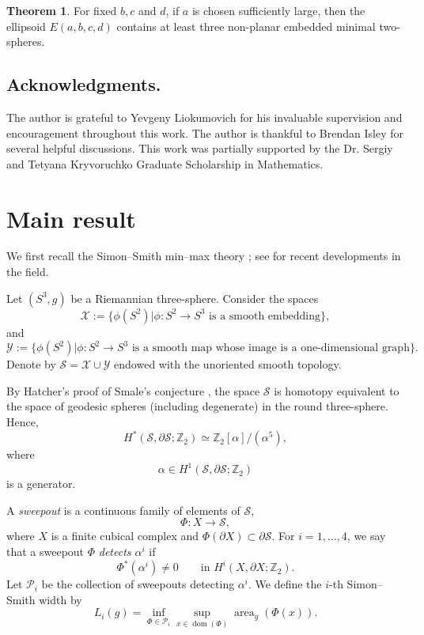 \documentclass[12pt,english]{amsart}
\theoremstyle{definition}
\newtheorem{theorem}{Theorem}[section]
\begin{document}
\begin{theorem}
\label{thm:yau}
For fixed $b,c$ and $d$, if $a$ is chosen sufficiently large, then the ellipsoid $E(a,b,c,d)$ contains at least three non-planar embedded minimal two-spheres.
\end{theorem}

\subsection*{Acknowledgments.}
The author is grateful to Yevgeny Liokumovich for his invaluable supervision and encouragement throughout this work. The author is thankful to Brendan Isley for several helpful discussions. This work was partially supported by the Dr. Sergiy and Tetyana Kryvoruchko Graduate Scholarship in Mathematics.

\section{Main result}

We first recall the Simon--Smith min--max theory \cite{SS}; see \cite{Chu, CL, CLhom, CLW1, CLW2, CD, DP, HK, HK1, K, LWY, LW, WZ} for recent developments in the field.

Let \((S^3,g)\) be a Riemannian three-sphere. Consider the spaces
\[
\mathcal X:=\{\phi(S^2)\big|\phi: S^2\to S^3 \text{ is a smooth embedding}\},
\]
and 
\[
\mathcal Y:=\{\phi(S^2)\big|\phi:S^2\to S^3 \text{ is a smooth map whose image is a one-dimensional graph}\}.
\]
Denote by $\mathcal S=\mathcal X\cup \mathcal Y$ endowed with the unoriented smooth topology.  

By Hatcher's proof of Smale's conjecture \cite{Ha}, the space \(\mathcal S\) is homotopy equivalent to the space of geodesic spheres (including degenerate) in the round three-sphere. Hence,
\[
H^*(\mathcal S,\partial\mathcal S;\mathbb Z_2)
\simeq
\mathbb Z_2[\alpha]/(\alpha^5),
\]
where
\[
\alpha\in H^1(\mathcal S,\partial\mathcal S;\mathbb Z_2)
\]
is a generator.

A \textit{sweepout} is a continuous family of elements of \(\mathcal S\),
\[
\Phi:X\to \mathcal S,
\]
where \(X\) is a finite cubical complex and \(\Phi(\partial X)\subset \partial\mathcal S\). For \(i=1,\ldots,4\), we say that a sweepout \(\Phi\) \textit{detects \(\alpha^i\)} if
\[
\Phi^*(\alpha^i)\neq 0
\qquad\text{in } H^i(X,\partial X;\mathbb Z_2).
\]
Let \(\mathcal P_i\) be the collection of sweepouts detecting \(\alpha^i\). We define the \(i\)-th Simon--Smith width by
\[
L_i(g)
=
\inf_{\Phi\in\mathcal P_i}
\sup_{x\in \operatorname{dom}(\Phi)}
\operatorname{area}_g(\Phi(x)).
\]
\end{document}
